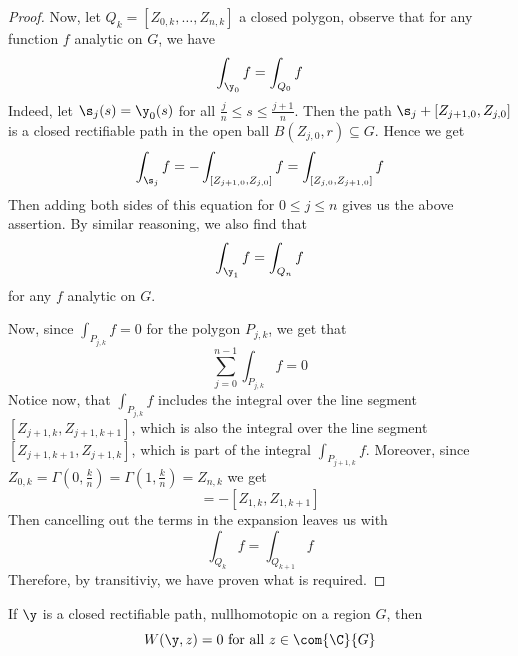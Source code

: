 \begin{proof}
     Now, let $Q_k=[Z_{0,k}, \dots, Z_{n,k}]$ a closed polygon, observe that for
     any function $f$ analytic on $G$, we have
     \begin{equation*}
         \int_{\y_0}{f}=\int_{Q_0}{f}
     \end{equation*}
     Indeed, let $\s_j(s)=\y_0(s)$ for all $\frac{j}{n} \leq s \leq
     \frac{j+1}{n}$. Then the path $\s_j+[Z_{j+1,0},Z_{j,0}]$ is a closed
     rectifiable path in the open ball $B(Z_{j,0},r) \subseteq G$. Hence we get
     \begin{equation*}
         \int_{\s_j}{f}=-\int_{[Z_{j+1,0},Z_{j,0}]}{f}=
         \int_{[Z_{j,0},Z_{j+1,0}]}{f}
     \end{equation*}
     Then adding both sides of this equation for $0 \leq j \leq n$ gives us the
     above assertion. By similar reasoning, we also find that
     \begin{equation*}
         \int_{\y_1}{f}=\int_{Q_n}{f}
     \end{equation*}
     for any $f$ analytic on $G$.

     Now, since $\int_{P_{j,k}}{f}=0$ for the polygon $P_{j,k}$, we get that
     \begin{equation*}
         \sum_{j=0}^{n-1}{\int_{P_{j,k}}{f}}=0
     \end{equation*}
     Notice now, that $\int_{P_{j,k}}{f}$ includes the integral over the line
     segment $[Z_{j+1,k}, Z_{j+1,k+1}]$, which is also the integral over the
     line segment $[Z_{j+1,k+1}, Z_{j+1,k}]$, which is part of the integral
     $\int_{P_{j+1,k}}{f}$. Moreover, since
     $Z_{0,k}=\Gamma(0,\frac{k}{n})=\Gamma(1,\frac{k}{n})=Z_{n,k}$ we get
     \begin{equation*}
         [Z_{o,k+1},Z_{0,k}]=-[Z_{1,k},Z_{1,k+1}]
     \end{equation*}
     Then cancelling out the terms in the expansion leaves us with
     \begin{equation*}
         \int_{Q_k}{f}=\int_{Q_{k+1}}{f}
     \end{equation*}
     Therefore, by transitiviy, we have proven what is required.
\end{proof}
\begin{corollary}
    If $\y$ is a closed rectifiable path, nullhomotopic on a region  $G$, then
    \begin{equation*}
        W(\y,z)=0 \text{ for all } z \in \com{\C}{G}
    \end{equation*}
\end{corollary}

